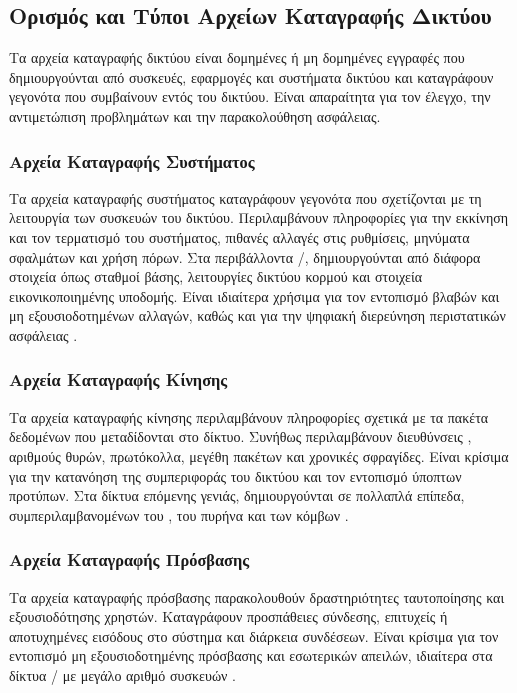 \subsection{Ορισμός και Τύποι Αρχείων Καταγραφής Δικτύου}

Τα αρχεία καταγραφής δικτύου είναι δομημένες ή μη δομημένες εγγραφές που δημιουργούνται από συσκευές, εφαρμογές και συστήματα δικτύου και καταγράφουν γεγονότα που συμβαίνουν εντός του δικτύου. Είναι απαραίτητα για τον έλεγχο, την αντιμετώπιση προβλημάτων και την παρακολούθηση ασφάλειας.

\subsubsection{Αρχεία Καταγραφής Συστήματος}

Τα αρχεία καταγραφής συστήματος καταγράφουν γεγονότα που σχετίζονται με τη λειτουργία των συσκευών του δικτύου. Περιλαμβάνουν πληροφορίες για την εκκίνηση και τον τερματισμό του συστήματος, πιθανές αλλαγές στις ρυθμίσεις, μηνύματα σφαλμάτων και χρήση πόρων. Στα περιβάλλοντα /, δημιουργούνται από διάφορα στοιχεία όπως σταθμοί βάσης, λειτουργίες δικτύου κορμού και στοιχεία εικονικοποιημένης υποδομής. Είναι ιδιαίτερα χρήσιμα για τον εντοπισμό βλαβών και μη εξουσιοδοτημένων αλλαγών, καθώς και για την ψηφιακή διερεύνηση περιστατικών ασφάλειας \cite{xu2009detecting}.

\subsubsection{Αρχεία Καταγραφής Κίνησης}

Τα αρχεία καταγραφής κίνησης περιλαμβάνουν πληροφορίες σχετικά με τα πακέτα δεδομένων που μεταδίδονται στο δίκτυο. Συνήθως περιλαμβάνουν διευθύνσεις , αριθμούς θυρών, πρωτόκολλα, μεγέθη πακέτων και χρονικές σφραγίδες. Είναι κρίσιμα για την κατανόηση της συμπεριφοράς του δικτύου και τον εντοπισμό ύποπτων προτύπων. Στα δίκτυα επόμενης γενιάς, δημιουργούνται σε πολλαπλά επίπεδα, συμπεριλαμβανομένων του , του πυρήνα και των κόμβων  \cite{garcia2014anomaly}.

\subsubsection{Αρχεία Καταγραφής Πρόσβασης}

Τα αρχεία καταγραφής πρόσβασης παρακολουθούν δραστηριότητες ταυτοποίησης και εξουσιοδότησης χρηστών. Καταγράφουν προσπάθειες σύνδεσης, επιτυχείς ή αποτυχημένες εισόδους στο σύστημα και διάρκεια συνδέσεων. Είναι κρίσιμα για τον εντοπισμό μη εξουσιοδοτημένης πρόσβασης και εσωτερικών απειλών, ιδιαίτερα στα δίκτυα / με μεγάλο αριθμό συσκευών \cite{scarfone2007guide}.

